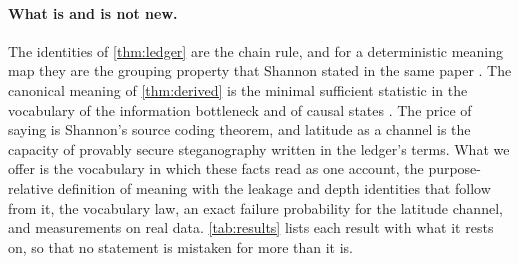 \paragraph{What is and is not new.} The identities of \cref{thm:ledger} are the chain rule, and for a deterministic meaning map they are the grouping property that Shannon stated in the same paper \citep{shannon1948}.
The canonical meaning of \cref{thm:derived} is the minimal sufficient statistic \citep{fisher1922,blackwell1953} in the vocabulary of the information bottleneck \citep{tishby2000} and of causal states \citep{shalizi2001}.
The price of saying is Shannon's source coding theorem, and latitude as a channel is the capacity of provably secure steganography \citep{cachin1998,hopper2002} written in the ledger's terms.
What we offer is the vocabulary in which these facts read as one account, the purpose-relative definition of meaning with the leakage and depth identities that follow from it, the vocabulary law, an exact failure probability for the latitude channel, and measurements on real data. \cref{tab:results} lists each result with what it rests on, so that no statement is mistaken for more than it is.
